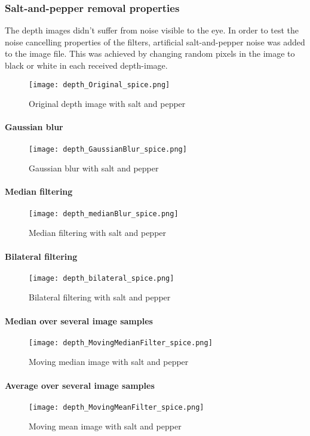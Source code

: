 \documentclass[DIV12,a4paper]{scrartcl}
\begin{document}
\subsubsection{Salt-and-pepper removal properties}
\label{sec:grain_removal}
The depth images didn't suffer from noise visible to the eye. In order to test the noise cancelling properties of the filters, artificial salt-and-pepper noise was added to the image file. This was achieved by changing random pixels in the image to black or white in each received depth-image. %
\par
\begin{figure}[!htbp]
  \centering
  \texttt{[image: depth\_Original\_spice.png]}
  \caption{Original depth image with salt and pepper}
  \label{fig:original_depth_spice}
\end{figure}
\paragraph{Gaussian blur}
\begin{figure}[!htbp]
  \centering
  \texttt{[image: depth\_GaussianBlur\_spice.png]}
  \caption{Gaussian blur with salt and pepper}
  \label{fig:gaussian_blur}
\end{figure}
\paragraph{Median filtering}
\begin{figure}[!htbp]
  \centering
  \texttt{[image: depth\_medianBlur\_spice.png]}
  \caption{Median filtering with salt and pepper}
  \label{fig:median_depth_spice}
\end{figure}
\paragraph{Bilateral filtering}
\begin{figure}[!htbp]
  \centering
  \texttt{[image: depth\_bilateral\_spice.png]}
  \caption{Bilateral filtering with salt and pepper}
  \label{fig:bilateral_depth_spice}
\end{figure}
\paragraph{Median over several image samples}
\begin{figure}[!htbp]
  \centering
  \texttt{[image: depth\_MovingMedianFilter\_spice.png]}
  \caption{Moving median image with salt and pepper}
  \label{fig:moving_median_depth_spice}
\end{figure}
\paragraph{Average over several image samples}
\begin{figure}[!htbp]
  \centering
  \texttt{[image: depth\_MovingMeanFilter\_spice.png]}
  \caption{Moving mean image with salt and pepper}
  \label{fig:moving_mean_depth_spice}
\end{figure}
\end{document}
